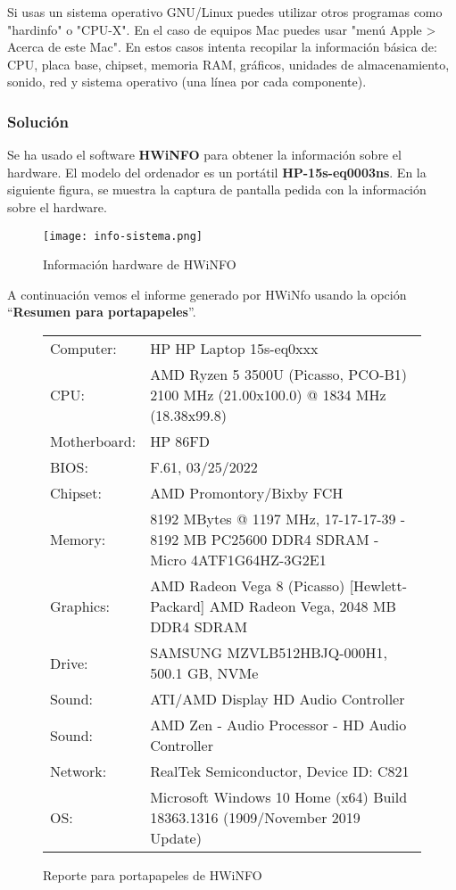 Si usas un sistema operativo GNU/Linux puedes utilizar otros programas como "hardinfo" o "CPU-X". En el caso de equipos Mac puedes usar "menú Apple > Acerca de este Mac". En estos casos intenta recopilar la información básica de: CPU, placa base, chipset, memoria RAM, gráficos, unidades de almacenamiento, sonido, red y sistema operativo (una línea por cada componente).

\subsubsection{Solución}
Se ha usado el software \textbf{HWiNFO} para obtener la información sobre el hardware. El modelo del ordenador es un portátil \textbf{HP-15s-eq0003ns}. En la siguiente figura, se muestra la captura de pantalla pedida con la información sobre el hardware.

\begin{figure}[ht]
    \centering
    \texttt{[image: info-sistema.png]}
    \caption{Información hardware de HWiNFO}
\end{figure}

A continuación vemos el informe generado por HWiNfo usando la opción ``\textbf{Resumen para portapapeles}''.

\begin{figure}[ht]
    \begin{tcolorbox}[sharp corners, colback=yellow!30, colframe=white!20]
\begin{center}
    \begin{tabular}{p{6em} p{31em}}
        Computer:   &  HP HP Laptop 15s-eq0xxx \\
        CPU:        &  AMD Ryzen 5 3500U (Picasso, PCO-B1) 2100 MHz (21.00x100.0) @ 1834 MHz (18.38x99.8) \\
        Motherboard:&  HP 86FD  \\
        BIOS:       &  F.61, 03/25/2022 \\
        Chipset:    &  AMD Promontory/Bixby FCH \\
        Memory:     &  8192 MBytes @ 1197 MHz, 17-17-17-39 - 8192 MB PC25600 DDR4 SDRAM - Micro 4ATF1G64HZ-3G2E1 \\
        Graphics:   &  AMD Radeon Vega 8 (Picasso) [Hewlett-Packard] AMD Radeon Vega, 2048 MB DDR4 SDRAM \\
        Drive:      &  SAMSUNG MZVLB512HBJQ-000H1, 500.1 GB, NVMe \\
        Sound:      &  ATI/AMD Display HD Audio Controller \\
        Sound:      &  AMD Zen - Audio Processor - HD Audio Controller \\
        Network:    &  RealTek Semiconductor, Device ID: C821 \\
        OS:         &  Microsoft Windows 10 Home (x64) Build 18363.1316 (1909/November 2019 Update) \\
    \end{tabular}
\end{center}
    \end{tcolorbox}
    \caption{Reporte para portapapeles de HWiNFO}
\end{figure}

